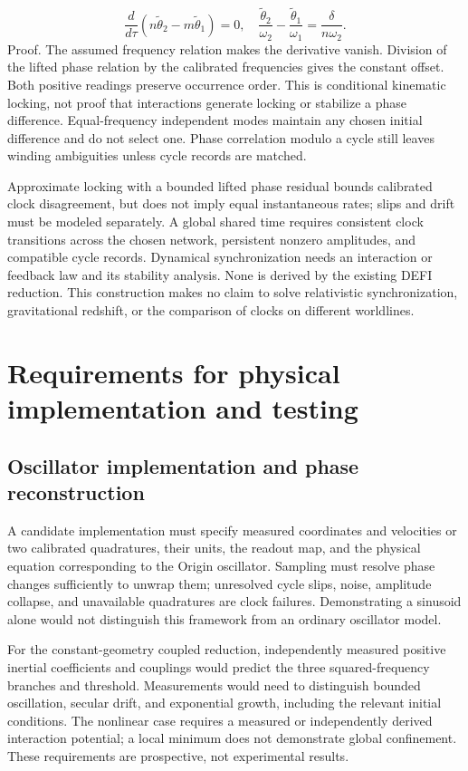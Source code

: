 \documentclass[aip,adv,preprint,floatfix]{revtex4-2}
\begin{document}
\begin{equation}
\frac{d}{d\tau}(n\widetilde\theta_2-m\widetilde\theta_1)=0,\quad\frac{\widetilde\theta_2}{\omega_2}-\frac{\widetilde\theta_1}{\omega_1}=\frac{\delta}{n\omega_2}.
\end{equation}
Proof. The assumed frequency relation makes the derivative vanish. Division of the lifted phase relation by the calibrated frequencies gives the constant offset. Both positive readings preserve occurrence order. This is conditional kinematic locking, not proof that interactions generate locking or stabilize a phase difference. Equal-frequency independent modes maintain any chosen initial difference and do not select one. Phase correlation modulo a cycle still leaves winding ambiguities unless cycle records are matched.

Approximate locking with a bounded lifted phase residual bounds calibrated clock disagreement, but does not imply equal instantaneous rates; slips and drift must be modeled separately. A global shared time requires consistent clock transitions across the chosen network, persistent nonzero amplitudes, and compatible cycle records. Dynamical synchronization needs an interaction or feedback law and its stability analysis. None is derived by the existing DEFI reduction. This construction makes no claim to solve relativistic synchronization, gravitational redshift, or the comparison of clocks on different worldlines.

\section{Requirements for physical implementation and testing}
\subsection*{Oscillator implementation and phase reconstruction}
A candidate implementation must specify measured coordinates and velocities or two calibrated quadratures, their units, the readout map, and the physical equation corresponding to the Origin oscillator. Sampling must resolve phase changes sufficiently to unwrap them; unresolved cycle slips, noise, amplitude collapse, and unavailable quadratures are clock failures. Demonstrating a sinusoid alone would not distinguish this framework from an ordinary oscillator model.

For the constant-geometry coupled reduction, independently measured positive inertial coefficients and couplings would predict the three squared-frequency branches and threshold. Measurements would need to distinguish bounded oscillation, secular drift, and exponential growth, including the relevant initial conditions. The nonlinear case requires a measured or independently derived interaction potential; a local minimum does not demonstrate global confinement. These requirements are prospective, not experimental results.
\end{document}
